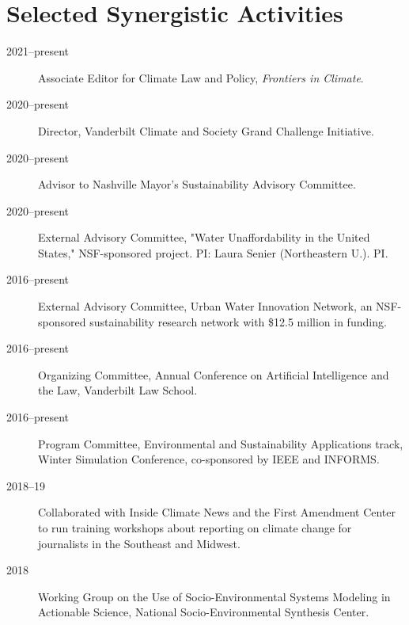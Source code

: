 \documentclass[10pt]{article}
\begin{document}
 \section{Selected Synergistic Activities}
 \begin{description}
   \item [2021--present] Associate Editor for Climate Law and Policy,
     \emph{Frontiers in Climate}.
   \item[2020--present] Director, Vanderbilt Climate and Society Grand
     Challenge Initiative.
  \item[2020--present] Advisor to Nashville Mayor's Sustainability Advisory
    Committee.
  \item[2020--present] External Advisory Committee, "Water Unaffordability in
    the United States," NSF-sponsored project. PI: Laura Senier (Northeastern U.).
    PI.
   \item[2016--present] External Advisory Committee,
     Urban Water Innovation Network, an NSF-sponsored sustainability research
     network with \$12.5 million in funding.
  \item[2016--present] Organizing Committee, Annual Conference on Artificial
    Intelligence and the Law, Vanderbilt Law School.
  \item[2016--present] Program Committee, Environmental and Sustainability
    Applications track, Winter Simulation Conference, co-sponsored by IEEE and
    INFORMS.
  \item[2018--19] Collaborated with Inside Climate News and the First Amendment
    Center to run training workshops about reporting on climate change for
    journalists in the Southeast and Midwest.
  \item[2018] Working Group on the Use of Socio-Environmental Systems Modeling
    in Actionable Science, National Socio-Environmental Synthesis Center.
 \end{description}
\end{document}

